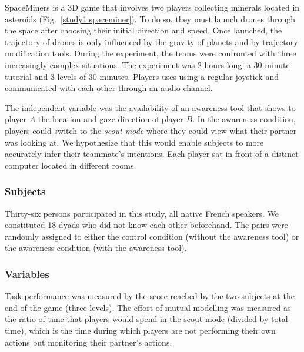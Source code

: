 \documentclass[natbib]{svjour3}
\begin{document}
{\sc SpaceMiners} is a 3D game that involves two players collecting minerals located
in asteroids (Fig.~\ref{study1:spaceminer}). To do so, they must launch drones through
the space after choosing their initial direction and speed. Once launched, the
trajectory of drones is only influenced by the gravity of planets and by
trajectory modification tools.  During the experiment, the teams were confronted
with three increasingly complex situations. The experiment was 2 hours long: a
30 minute tutorial and 3 levels of 30 minutes. Players uses using a regular
joystick and communicated with each other through an audio channel.

The independent variable was the availability of an awareness tool that shows to
player $A$  the location and gaze direction of player $B$. In the awareness
condition, players could switch to the \emph{scout mode} where they could view what
their partner was looking at. We hypothesize that this would enable subjects to
more accurately infer their teammate's intentions. Each player sat in front of a
distinct computer located in different rooms. 

\subsubsection*{Subjects}

Thirty-six persons participated in this study, all native French speakers. We
constituted 18 dyads who did not know each other beforehand. The pairs were
randomly assigned to either the control condition (without the awareness tool)
or the awareness condition (with the awareness tool).

\subsubsection*{Variables}

Task performance was measured by the score reached by the two subjects at the
end of the game (three levels). The effort of mutual modelling was measured as
the ratio of time that players would spend in the scout mode (divided by total
time), which is the time during which players are not performing their own
actions but monitoring their partner's actions.
\end{document}
